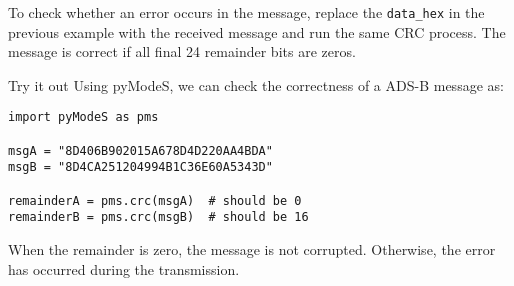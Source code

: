 To check whether an error occurs in the message, replace the \texttt{data\_hex} in the previous example with the received message and run the same CRC process. The message is correct if all final 24 remainder bits are zeros.

\begin{notebox}{Try it out}
Using pyModeS, we can check the correctness of a ADS-B message as: 

\begin{verbatim}
import pyModeS as pms

msgA = "8D406B902015A678D4D220AA4BDA"
msgB = "8D4CA251204994B1C36E60A5343D"

remainderA = pms.crc(msgA)  # should be 0
remainderB = pms.crc(msgB)  # should be 16
\end{verbatim}

When the remainder is zero, the message is not corrupted. Otherwise, the error has occurred during the transmission.
\end{notebox}